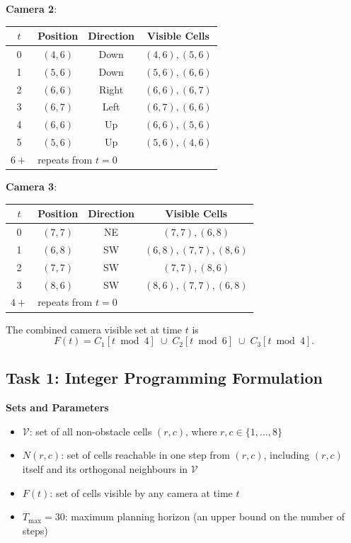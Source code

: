 \documentclass[12pt,a4paper]{article}
\begin{document}
\textbf{Camera 2}:

\begin{center}
\begin{tabular}{cccc}
\toprule
$t$ & Position & Direction & Visible Cells \\
\midrule
0 & $(4,6)$ & Down  & $(4,6),(5,6)$ \\
1 & $(5,6)$ & Down  & $(5,6),(6,6)$ \\
2 & $(6,6)$ & Right & $(6,6),(6,7)$ \\
3 & $(6,7)$ & Left  & $(6,7),(6,6)$ \\
4 & $(6,6)$ & Up    & $(6,6),(5,6)$ \\
5 & $(5,6)$ & Up    & $(5,6),(4,6)$ \\
$6+$ & \multicolumn{3}{l}{repeats from $t=0$} \\
\bottomrule
\end{tabular}
\end{center}

\textbf{Camera 3}:

\begin{center}
\begin{tabular}{cccc}
\toprule
$t$ & Position & Direction & Visible Cells \\
\midrule
0 & $(7,7)$ & NE & $(7,7),(6,8)$ \\
1 & $(6,8)$ & SW & $(6,8),(7,7),(8,6)$ \\
2 & $(7,7)$ & SW & $(7,7),(8,6)$ \\
3 & $(8,6)$ & SW & $(8,6),(7,7),(6,8)$ \\
$4+$ & \multicolumn{3}{l}{repeats from $t=0$} \\
\bottomrule
\end{tabular}
\end{center}

The combined camera visible set at time $t$ is
\[
  F(t) = C_1[t \bmod 4]\;\cup\; C_2[t \bmod 6]\;\cup\; C_3[t \bmod 4].
\]

\subsection*{Task 1: Integer Programming Formulation}

\textbf{Sets and Parameters}
\begin{itemize}
  \item $\mathcal{V}$: set of all non-obstacle cells $(r,c)$, where $r,c\in\{1,\ldots,8\}$
  \item $N(r,c)$: set of cells reachable in one step from $(r,c)$, including $(r,c)$ itself
        and its orthogonal neighbours in $\mathcal{V}$
  \item $F(t)$: set of cells visible by any camera at time $t$
  \item $T_{\max}=30$: maximum planning horizon (an upper bound on the number of steps)
\end{itemize}
\end{document}
